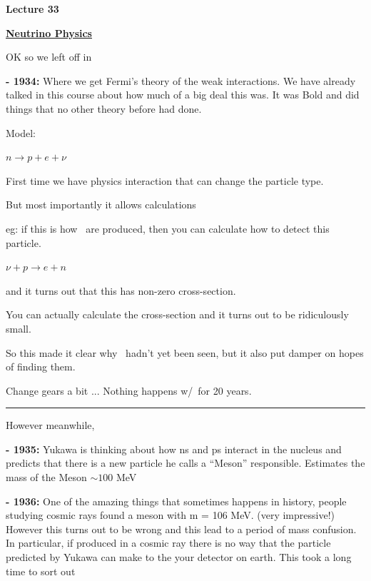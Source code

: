 



\thispagestyle{fancy}

\begin{center}
{\huge \textbf{Lecture 33}}
\end{center}

{\fontsize{14}{16}\selectfont

\textbf{\underline{Neutrino Physics}} 

OK so we left off in

\textbf{- 1934:} Where we get Fermi's theory of the weak interactions.  We have already talked in this course about how much of a big deal this was. 
It was Bold and did things that no other theory before had done. 

Model: 

\bc
$n \rightarrow p + e + \nu$
\ec

First time we have physics interaction that can change the particle type. 

But most importantly it allows calculations 

eg: if this is how \nus\ are produced, then you can calculate how to detect this particle. 

\bc
$\nu + p \rightarrow e + n$
\ec

and it turns out that this has non-zero cross-section. 

You can actually calculate the cross-section and it turns out to be ridiculously small.

So this made it clear why \nus\ hadn't yet been seen, but it also put damper on hopes of finding them. 



Change gears a bit ... Nothing happens w/\nus\ for 20 years.

\noindent\rule{\textwidth}{1pt}

However meanwhile, 

\textbf{- 1935:} Yukawa is thinking about how ns and ps interact in the nucleus and predicts that there is a new particle he calls a ``Meson'' responsible. 
Estimates the mass of the Meson $\sim 100$ MeV


\textbf{- 1936:} One of the amazing things that sometimes happens in history, people studying cosmic rays found a meson with m = 106 MeV. (very impressive!)
However this turns out to be wrong and this lead to a period of mass confusion.   
In particular, if produced in a cosmic ray there is no way that the particle predicted by Yukawa can make to the your detector on earth. 
This took a long time to sort out

}
